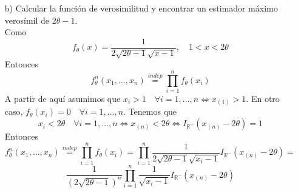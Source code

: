 \documentclass[12pt]{article}
\newcommand{\R}{\mathbb{R}}
\newcommand{\Rmenos}{\R^{-}}
\begin{document}
\begin{ejercicio}[2,25 puntos]
\begin{enumerate}
            \newpage

            Por construcción $h(T)$ es insesgada en $g(\theta)$. Vemos que $h(T)$ también es estimador de $g(\theta)$, 
            pues $\Theta = \left] 1/2, +\infty \right[$, y $g(\theta) = \frac{1}{2\theta-1} \Longrightarrow g(\Theta) = \left]0,+\infty \right[$. 
            Como $T = X_{(n)} > 1$, entonces $T - 1 > 0$, y $\frac{n-2}{n} > 0$ si $n \geq 3$, luego $h(T) > 0$ si $n \geq 3$. Queda comprobar que tiene momento de segundo orden finito. \\

            Ello se cumplirá en caso de que $E[h(T)^2] < + \infty$:
            $$E[h(T)^2] \stackrel{def}{=} \int_{1}^{2 \theta} h(t)^2 f_T(t) dt = \int_{1}^{2 \theta} 
            \left( \dfrac{n-2}{n} \right)^2 \dfrac{1}{(t-1)^2} \dfrac{n(\sqrt{t-1})^{n-2}}{2(\sqrt{2\theta-1})^{n}} dt = $$
            $$\dfrac{(n-2)^2}{2n(2\theta-1)^{n/2}} \int_{1}^{2 \theta} (t-1)^{(n-6)/2}dt = 
            \dfrac{(n-2)^2}{2n(2\theta-1)^{n/2}} \dfrac{2}{(n-4)} \left[(t-1)^{(n-4)/2} \right]_1^{2 \theta} = $$
            $$\dfrac{(n-2)^2}{n(n-4)} \dfrac{(2\theta-1)^{(n-4)/2}}{(2\theta-1)^{n/2}} = \dfrac{(n-2)^2}{n(n-4)} \dfrac{1}{(2\theta-1)^2}$$

            Y vemos que $E[h(T)^2] < + \infty \iff n > 4$, ya que si $n \leq 4$, el momento de segundo orden no es finito.
            Por tanto, por el Teorema de Lehmann-Scheffé, $E[h(T)/T] = h(T)$ es el UMVUE para $g(\theta)$, y existe siempre y
            cuando $$n>4 \iff n \geq 5$$

            \item[b)] Calcular la función de verosimilitud y encontrar un estimador máximo verosímil de $2\theta-1$. \\
            
            Como $$f_\theta(x)=\dfrac{1}{2\sqrt{2\theta-1}\sqrt{x-1}}, \quad 1<x<2\theta$$
            Entonces $$f_\theta^n(x_1, \ldots, x_n) \stackrel{indep}{=} \prod_{i=1}^{n} f_\theta(x_i)$$
            A partir de aquí asumimos que $x_i > 1 \quad \forall i = 1, \ldots, n \iff x_{(1)} > 1$. En otro caso, $f_\theta(x_i) = 0 \quad \forall i = 1, \ldots, n$. Tenemos que
            $$x_i < 2 \theta \quad \forall i = 1, \ldots, n \iff x_{(n)} < 2 \theta \iff I_{\Rmenos}(x_{(n)} - 2 \theta) = 1$$
            Entonces
            $$f_\theta^n(x_1, \ldots, x_n) \stackrel{indep}{=} \prod_{i=1}^{n} f_\theta(x_i) = \prod_{i=1}^n \dfrac{1}{2\sqrt{2\theta-1}\sqrt{x_i-1}} I_{\Rmenos}(x_{(n)} - 2 \theta) =$$
            $$\dfrac{1}{(2\sqrt{2\theta-1})^n} \prod_{i=1}^n \dfrac{1}{\sqrt{x_i-1}} I_{\Rmenos}(x_{(n)} - 2 \theta)$$


\end{enumerate}
\end{ejercicio}
\end{document}
